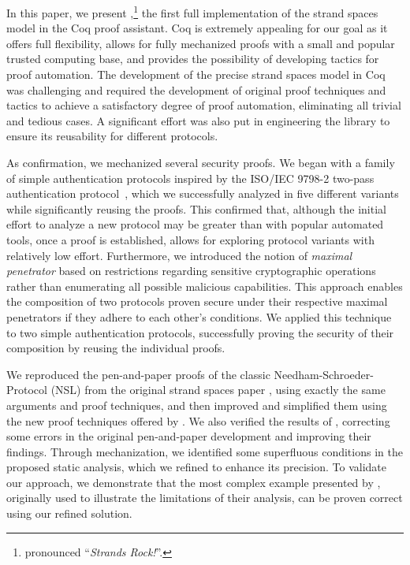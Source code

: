 In this paper, we present \easystrands{},\footnote{pronounced ``\emph{Strands Rock!}''.} the first full implementation of the strand spaces model in the Coq proof assistant.
Coq is extremely appealing for our goal as it offers full flexibility, allows for fully mechanized proofs with a small and popular trusted computing base, and provides the possibility of developing tactics for proof automation.
The development of the precise strand spaces model in Coq was challenging and required the development of original proof techniques and tactics to achieve a satisfactory degree of proof automation, eliminating all trivial and tedious cases.
A significant effort was also put in engineering the library to ensure its reusability for different protocols.

As confirmation, we mechanized several security proofs.
We began with a family of simple authentication protocols inspired by the ISO/IEC 9798-2 two-pass authentication protocol~\cite{ISO97982}, which we successfully analyzed in five different variants while significantly reusing the proofs. This confirmed that, although the initial effort to analyze a new protocol may be greater than with popular automated tools, once a proof is established, \easystrands{} allows for exploring protocol variants with relatively low effort. Furthermore, we introduced the notion of \emph{maximal penetrator} based on restrictions regarding sensitive cryptographic operations rather than enumerating all possible malicious capabilities. This approach enables the composition of two protocols proven secure under their respective maximal penetrators if they adhere to each other's conditions. We applied this technique to two simple authentication protocols, successfully proving the security of their composition by reusing the individual proofs.

We reproduced the pen-and-paper proofs of the classic Needham-Schroeder-Protocol (NSL) from the original strand spaces paper \cite{FHG98}, using exactly the same arguments and proof techniques, and then improved and simplified them using the new proof techniques offered by \easystrands{}.
We also verified the results of \citet{focardi2021secure}, correcting some errors in the original pen-and-paper development and improving their findings. Through mechanization, we identified some superfluous conditions in the proposed static analysis, which we refined to enhance its precision. To validate our approach, we demonstrate that the most complex example presented by \citet{focardi2021secure}, originally used to illustrate the limitations of their analysis, can be proven correct using our refined solution.



